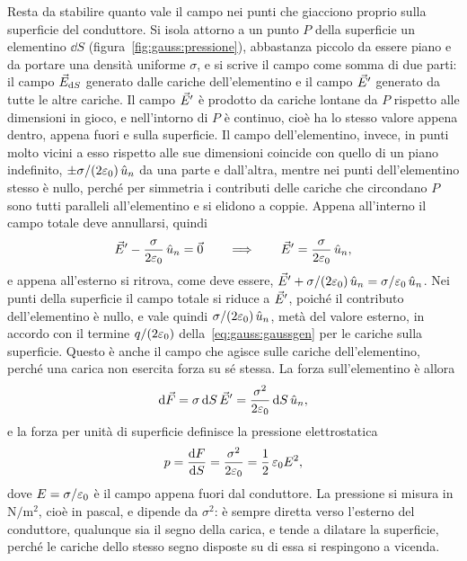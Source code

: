 \documentclass[11pt,a4paper]{article}
\begin{document}
Resta da stabilire quanto vale il campo nei punti che giacciono proprio sulla superficie del conduttore. Si isola attorno a un punto $P$ della superficie un elementino $\dd S$ (figura~\ref{fig:gauss:pressione}), abbastanza piccolo da essere piano e da portare una densità uniforme $\sigma$, e si scrive il campo come somma di due parti: il campo $\vec{E}_{\mathrm{d} S}$ generato dalle cariche dell'elementino e il campo $\vec{E}'$ generato da tutte le altre cariche. Il campo $\vec{E}'$ è prodotto da cariche lontane da $P$ rispetto alle dimensioni in gioco, e nell'intorno di $P$ è continuo, cioè ha lo stesso valore appena dentro, appena fuori e sulla superficie. Il campo dell'elementino, invece, in punti molto vicini a esso rispetto alle sue dimensioni coincide con quello di un piano indefinito, $\pm\sigma/(2\varepsilon_0)\,\hat{u}_n$ da una parte e dall'altra, mentre nei punti dell'elementino stesso è nullo, perché per simmetria i contributi delle cariche che circondano $P$ sono tutti paralleli all'elementino e si elidono a coppie. Appena all'interno il campo totale deve annullarsi, quindi
\[
\vec{E}'-\frac{\sigma}{2\varepsilon_0}\,\hat{u}_n=\vec{0}
\qquad\Longrightarrow\qquad
\vec{E}'=\frac{\sigma}{2\varepsilon_0}\,\hat{u}_n ,
\]
e appena all'esterno si ritrova, come deve essere, $\vec{E}'+\sigma/(2\varepsilon_0)\,\hat{u}_n=\sigma/\varepsilon_0\,\hat{u}_n$. Nei punti della superficie il campo totale si riduce a $\vec{E}'$, poiché il contributo dell'elementino è nullo, e vale quindi $\sigma/(2\varepsilon_0)\,\hat{u}_n$, metà del valore esterno, in accordo con il termine $q/(2\varepsilon_0)$ della~\eqref{eq:gauss:gaussgen} per le cariche sulla superficie. Questo è anche il campo che agisce sulle cariche dell'elementino, perché una carica non esercita forza su sé stessa. La forza sull'elementino è allora
\[
\mathrm{d}\vec{F}=\sigma\,\mathrm{d} S\,\vec{E}'=\frac{\sigma^2}{2\varepsilon_0}\,\mathrm{d} S\,\hat{u}_n ,
\]
e la forza per unità di superficie definisce la pressione elettrostatica
\begin{equation}
p=\frac{\mathrm{d} F}{\mathrm{d} S}=\frac{\sigma^2}{2\varepsilon_0}=\frac{1}{2}\,\varepsilon_0 E^2 ,
\label{eq:gauss:pressione}
\end{equation}
dove $E=\sigma/\varepsilon_0$ è il campo appena fuori dal conduttore. La pressione si misura in $\mathrm{N/m^2}$, cioè in pascal, e dipende da $\sigma^2$: è sempre diretta verso l'esterno del conduttore, qualunque sia il segno della carica, e tende a dilatare la superficie, perché le cariche dello stesso segno disposte su di essa si respingono a vicenda.
\end{document}
